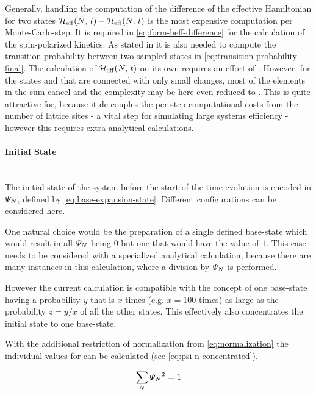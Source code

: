 Generally, handling the computation of the difference of the effective Hamiltonian for two states $\HeffOft[\tilde{N}]-\HeffOft[N]$ is the most expensive computation per Monte-Carlo-step.
It is required in \autoref{eq:form-heff-difference} for the calculation of the spin-polarized kinetics.
As stated in  it is also needed to compute the transition probability between two sampled states in \autoref{eq:transition-probability-final}.
The calculation of $\HeffOft[N]$ on its own requires an effort of .
However, for the states \ketN[N] and  that are connected with only small changes, most of the elements in the sum cancel and the complexity may be here even reduced to .
This is quite attractive for, because it de-couples the per-step computational costs from the number of lattice sites - a vital step for simulating large systems efficiency - however this requires extra analytical calculations.

\paragraph*{Initial State} \makebox{}\\

The initial state of the system before the start of the time-evolution is encoded in $\psiN$, defined by \autoref{eq:base-expansion-state}. Different configurations can be considered here.

One natural choice would be the preparation of a single defined base-state which would result in all $\psiN$ being $0$ but one that would have the value of $1$. 
This case needs to be considered with a specialized analytical calculation, because there are many instances in this calculation, where a division by $\psiN$ is performed. 

However the current calculation is compatible with the concept of one base-state having a probability $y$ that is $x$ times (e.g. $x=100$-times) as large as the probability $z = y/x$ of all the other states.
This effectively also concentrates the initial state to one base-state.

With the additional restriction of normalization from \autoref{eq:normalization} the individual values for \psiN{} can be calculated (see \autoref{eq:psi-n-concentrated}).

\begin{equation}
    \label{eq:normalization}
    \lsum[N] \psiN{}^2 = 1
\end{equation}


